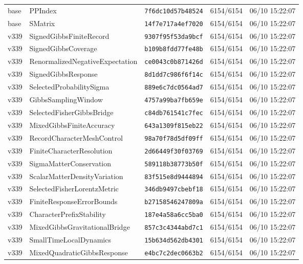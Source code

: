 \documentclass[11pt]{article}
\theoremstyle{definition}\newtheorem{deriv}{Derivação}
\begin{document}
{\begin{longtable}{@{}lllll@{}}
base & PPIndex & \texttt{7f6dc10d57b48524} & 6154/6154 & 06/10 15:22:07 \\
base & SMatrix & \texttt{14f7e717a4ef7020} & 6154/6154 & 06/10 15:22:07 \\
v339 & SignedGibbsFiniteRecord & \texttt{9307f95f53da9bcf} & 6154/6154 & 06/10 15:22:07 \\
v339 & SignedGibbsCoverage & \texttt{b109b8fdd77fe48b} & 6154/6154 & 06/10 15:22:07 \\
v339 & RenormalizedNegativeExpectation & \texttt{ce0043c0b871426d} & 6154/6154 & 06/10 15:22:07 \\
v339 & SignedGibbsResponse & \texttt{8d1dd7c986f6f14c} & 6154/6154 & 06/10 15:22:07 \\
v339 & SelectedProbabilitySigma & \texttt{889e6c7dc0564ad7} & 6154/6154 & 06/10 15:22:07 \\
v339 & GibbsSamplingWindow & \texttt{4757a99ba7fb659e} & 6154/6154 & 06/10 15:22:07 \\
v339 & SelectedFisherGibbsBridge & \texttt{c84db761541c7fec} & 6154/6154 & 06/10 15:22:07 \\
v339 & MixedGibbsFiniteAccuracy & \texttt{643a1309f815eb22} & 6154/6154 & 06/10 15:22:07 \\
v339 & RecordCharacterMeshControl & \texttt{98a70f78d5df09ff} & 6154/6154 & 06/10 15:22:07 \\
v339 & FiniteCharacterResolution & \texttt{2d66449f30f03769} & 6154/6154 & 06/10 15:22:07 \\
v339 & SigmaMatterConservation & \texttt{589118b38773b50f} & 6154/6154 & 06/10 15:22:07 \\
v339 & ScalarMatterDensityVariation & \texttt{83f515e8d9444894} & 6154/6154 & 06/10 15:22:07 \\
v339 & SelectedFisherLorentzMetric & \texttt{346db9497cbebf18} & 6154/6154 & 06/10 15:22:07 \\
v339 & FiniteResponseErrorBounds & \texttt{b27158546247809a} & 6154/6154 & 06/10 15:22:07 \\
v339 & CharacterPrefixStability & \texttt{187e4a58a6cc5ba0} & 6154/6154 & 06/10 15:22:07 \\
v339 & MixedGibbsGravitationalBridge & \texttt{857c3c4344abd7c1} & 6154/6154 & 06/10 15:22:07 \\
v339 & SmallTimeLocalDynamics & \texttt{15b634d562db4301} & 6154/6154 & 06/10 15:22:07 \\
v339 & MixedQuadraticGibbsResponse & \texttt{e4bc7c2dec0663b2} & 6154/6154 & 06/10 15:22:07 \\

\end{longtable}}
\end{document}
